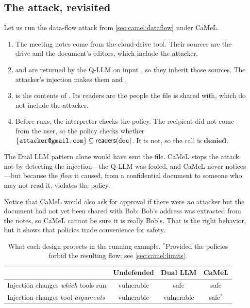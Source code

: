 \subsection{The attack, revisited}

Let us run the data-flow attack from \cref{sec:camel:dataflow} under
CaMeL.
\begin{enumerate}
\item The meeting notes come from the cloud-drive tool. Their sources
  are the drive and the document's editors, which include the attacker.
\item {} and  are returned by the Q-LLM on input
  , so they inherit those sources. The attacker's injection
  makes them  and .
\item {} is the contents of . Its readers
  are the people the file is shared with, which do not include the
  attacker.
\item Before  runs, the
  interpreter checks the policy. The recipient  did not come
  from the user, so the policy checks whether
  $\{\ttt{attacker@gmail.com}\} \subseteq \mathsf{readers}(\ttt{doc})$.
  It is not, so the call is \textbf{denied}.
\end{enumerate}
The Dual LLM pattern alone would have sent the file.
CaMeL stops the attack not by detecting the injection---the Q-LLM was
fooled, and CaMeL never notices---but because the \emph{flow} it caused,
from a confidential document to someone who may not read it, violates
the policy.

Notice that CaMeL would also ask for approval if there were \emph{no}
attacker but the document had not yet been shared with Bob: Bob's
address was extracted from the notes, so CaMeL cannot be sure it is
really Bob's.
That is the right behavior, but it shows that policies trade
convenience for safety.

\begin{table}
\centering
\small
\begin{tabular}{lccc}
  & \textbf{Undefended} & \textbf{Dual LLM} & \textbf{CaMeL} \\ \hline
  Injection changes \emph{which} tools run & vulnerable & safe & safe \\
  Injection changes tool \emph{arguments} & vulnerable & vulnerable & safe$^*$ \\
\end{tabular}
\caption{What each design protects in the running example.
$^*$Provided the policies forbid the resulting flow; see
\cref{sec:camel:limits}.}
\label{tab:camel:compare}
\end{table}

